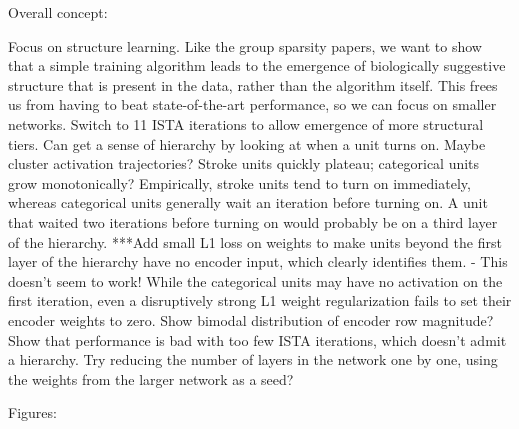 Overall concept:

Focus on structure learning.  Like the group sparsity papers, we want to show that a simple training algorithm leads to the emergence of biologically suggestive structure that is present in the data, rather than the algorithm itself.  This frees us from having to beat state-of-the-art performance, so we can focus on smaller networks.  
Switch to 11 ISTA iterations to allow emergence of more structural tiers.  
Can get a sense of hierarchy by looking at when a unit turns on.  Maybe cluster activation trajectories?  Stroke units quickly plateau; categorical units grow monotonically?  Empirically, stroke units tend to turn on immediately, whereas categorical units generally wait an iteration before turning on.  A unit that waited two iterations before turning on would probably be on a third layer of the hierarchy.  
***Add small L1 loss on weights to make units beyond the first layer of the hierarchy have no encoder input, which clearly identifies them.  - This doesn't seem to work!  While the categorical units may have no activation on the first iteration, even a disruptively strong L1 weight regularization fails to set their encoder weights to zero.
Show bimodal distribution of encoder row magnitude?
Show that performance is bad with too few ISTA iterations, which doesn't admit a hierarchy.  Try reducing the number of layers in the network one by one, using the weights from the larger network as a seed?



Figures:

